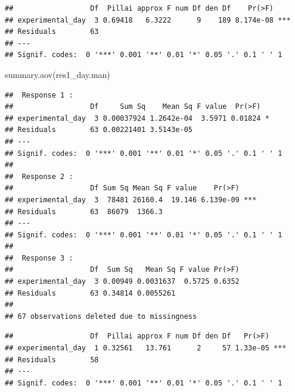 \documentclass[
]{article}
\newenvironment{Shaded}{\begin{snugshade}}{\end{snugshade}}
\newcommand{\AttributeTok}[1]{\textcolor[rgb]{0.77,0.63,0.00}{#1}}
\newcommand{\FunctionTok}[1]{\textcolor[rgb]{0.00,0.00,0.00}{#1}}
\newcommand{\NormalTok}[1]{#1}
\newcommand{\OtherTok}[1]{\textcolor[rgb]{0.56,0.35,0.01}{#1}}
\newcommand{\SpecialCharTok}[1]{\textcolor[rgb]{0.00,0.00,0.00}{#1}}
\begin{document}
\begin{verbatim}
##                  Df  Pillai approx F num Df den Df    Pr(>F)    
## experimental_day  3 0.69418   6.3222      9    189 8.174e-08 ***
## Residuals        63                                             
## ---
## Signif. codes:  0 '***' 0.001 '**' 0.01 '*' 0.05 '.' 0.1 ' ' 1
\end{verbatim}

\begin{Shaded}
\begin{Highlighting}[]
\FunctionTok{summary.aov}\NormalTok{(res1\_day.man)}
\end{Highlighting}
\end{Shaded}

\begin{verbatim}
##  Response 1 :
##                  Df     Sum Sq    Mean Sq F value  Pr(>F)  
## experimental_day  3 0.00037924 1.2642e-04  3.5971 0.01824 *
## Residuals        63 0.00221401 3.5143e-05                  
## ---
## Signif. codes:  0 '***' 0.001 '**' 0.01 '*' 0.05 '.' 0.1 ' ' 1
## 
##  Response 2 :
##                  Df Sum Sq Mean Sq F value    Pr(>F)    
## experimental_day  3  78481 26160.4  19.146 6.139e-09 ***
## Residuals        63  86079  1366.3                      
## ---
## Signif. codes:  0 '***' 0.001 '**' 0.01 '*' 0.05 '.' 0.1 ' ' 1
## 
##  Response 3 :
##                  Df  Sum Sq   Mean Sq F value Pr(>F)
## experimental_day  3 0.00949 0.0031637  0.5725 0.6352
## Residuals        63 0.34814 0.0055261               
## 
## 67 observations deleted due to missingness
\end{verbatim}

\begin{Shaded}
\end{Shaded}

\begin{verbatim}
##                  Df  Pillai approx F num Df den Df   Pr(>F)    
## experimental_day  1 0.32561   13.761      2     57 1.33e-05 ***
## Residuals        58                                            
## ---
## Signif. codes:  0 '***' 0.001 '**' 0.01 '*' 0.05 '.' 0.1 ' ' 1
\end{verbatim}
\end{document}
